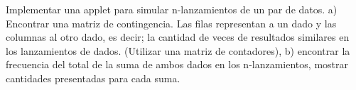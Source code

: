 Implementar una applet para simular n-lanzamientos de un par de datos. a) Encontrar una matriz de contingencia. Las filas representan a un dado y las columnas al otro dado, es decir; la cantidad de veces de resultados similares  en los lanzamientos de dados. (Utilizar una matriz de contadores), b) encontrar la frecuencia del total de la suma de ambos dados en los n-lanzamientos, mostrar cantidades presentadas para cada suma.